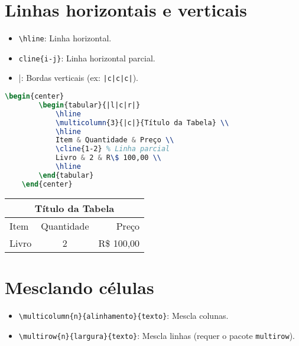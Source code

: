 \section{Linhas horizontais e verticais}

\begin{itemize}
    \item \verb|\hline|: Linha horizontal.
    \item \verb|cline{i-j}|: Linha horizontal parcial.
    \item \verb|||: Bordas verticais (ex: \texttt{|c|c|c|}).
\end{itemize}

\begin{lstlisting}[language=tex, caption=Exemplo de criação de tabela]
    \begin{center}
        \begin{tabular}{|l|c|r|}
            \hline
            \multicolumn{3}{|c|}{Título da Tabela} \\ 
            \hline
            Item & Quantidade & Preço \\ 
            \cline{1-2} % Linha parcial
            Livro & 2 & R\$ 100,00 \\ 
            \hline
        \end{tabular}
    \end{center}
\end{lstlisting}

\begin{center}
    \begin{tabular}{|l|c|r|}
        \hline
        \multicolumn{3}{|c|}{Título da Tabela} \\ 
        \hline
        Item & Quantidade & Preço \\ 
        \cline{1-2} %
        Livro & 2 & R\$ 100,00 \\ 
        \hline
    \end{tabular}
\end{center}

\section{Mesclando células}

\begin{itemize}
    \item \verb|\multicolumn{n}{alinhamento}{texto}|: Mescla colunas.
    \item \verb|\multirow{n}{largura}{texto}|: Mescla linhas (requer o pacote \verb|multirow|).
\end{itemize}

